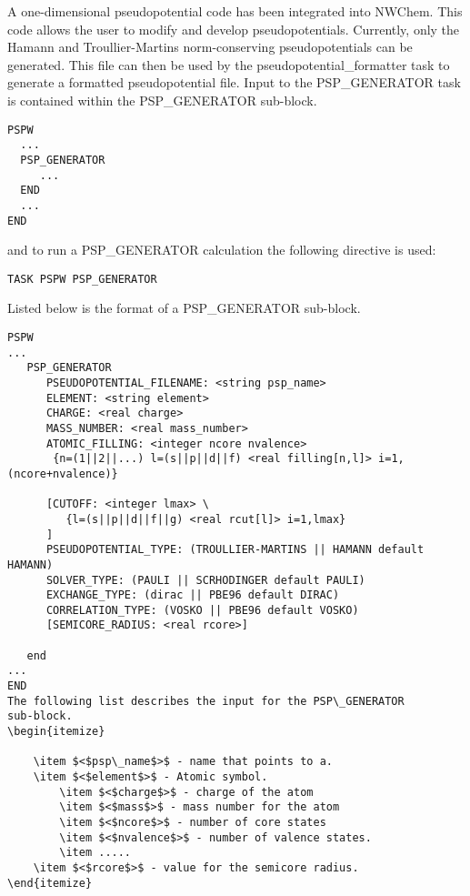 A one-dimensional pseudopotential code has been integrated into NWChem.
This code allows the user to modify and develop pseudopotentials.  Currently, 
only the Hamann and Troullier-Martins norm-conserving pseudopotentials can be
generated.  This file can then be used by the pseudopotential\_formatter 
task to generate a formatted pseudopotential file. 
Input to the PSP\_GENERATOR task is contained
within the PSP\_GENERATOR sub-block.
\begin{verbatim}
PSPW
  ...
  PSP_GENERATOR
     ...
  END
  ...
END
\end{verbatim}
and to run a PSP\_GENERATOR calculation the following directive 
is used:
\begin{verbatim}
TASK PSPW PSP_GENERATOR
\end{verbatim}
Listed below is the format of a PSP\_GENERATOR sub-block.
\begin{verbatim}
PSPW
... 
   PSP_GENERATOR
      PSEUDOPOTENTIAL_FILENAME: <string psp_name>
      ELEMENT: <string element>
      CHARGE: <real charge>
      MASS_NUMBER: <real mass_number>
      ATOMIC_FILLING: <integer ncore nvalence>
       {n=(1||2||...) l=(s||p||d||f) <real filling[n,l]> i=1,(ncore+nvalence)}
      
      [CUTOFF: <integer lmax> \
         {l=(s||p||d||f||g) <real rcut[l]> i=1,lmax}
      ]
      PSEUDOPOTENTIAL_TYPE: (TROULLIER-MARTINS || HAMANN default HAMANN)
      SOLVER_TYPE: (PAULI || SCRHODINGER default PAULI)
      EXCHANGE_TYPE: (dirac || PBE96 default DIRAC)
      CORRELATION_TYPE: (VOSKO || PBE96 default VOSKO)
      [SEMICORE_RADIUS: <real rcore>]
      
   end
... 
END
The following list describes the input for the PSP\_GENERATOR
sub-block.
\begin{itemize}

	\item $<$psp\_name$>$ - name that points to a.
	\item $<$element$>$ - Atomic symbol.
        \item $<$charge$>$ - charge of the atom
        \item $<$mass$>$ - mass number for the atom
        \item $<$ncore$>$ - number of core states
        \item $<$nvalence$>$ - number of valence states.
        \item .....
	\item $<$rcore$>$ - value for the semicore radius. 
\end{itemize}



\end{verbatim}



